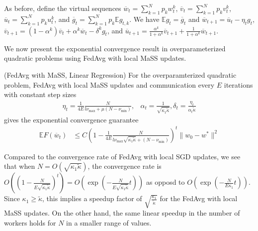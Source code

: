  As before, define the virtual sequences $\overline{w}_{t}=\sum_{k=1}^{N}p_{k}w_{t}^{k}$,
 $\overline{v}_{t}=\sum_{k=1}^{N}p_{k}v_{t}^{k}$, $\overline{u}_{t}=\sum_{k=1}^{N}p_{k}u_{t}^{k}$,
 and $\overline{g}_{t}=\sum_{k=1}^{N}p_{k}\mathbb{E}g_{t,k}$. We have
 $\mathbb{E}g_{t}=\overline{g}_{t}$ and $\overline{w}_{t+1}=\overline{u}_{t}-\eta_{t}g_{t}$,
 $\overline{v}_{t+1}=(1-\alpha^{k})\overline{v}_{t}+\alpha^{k}\overline{w}_{t}-\delta^{k}g_{t}$,
 and $\overline{u}_{t+1}=\frac{\alpha^{k}}{1+\alpha^{k}}\overline{v}_{t+1}+\frac{1}{1+\alpha^{k}}\overline{w}_{t+1}$. 
 
 We now present the exponential convergence result in overparameterized
 quadratic problems using FedAvg with local MaSS updates. 
 \begin{theorem}
 	(FedAvg with MaSS, Linear Regression) For the overparamterized quadratic
 	problem, FedAvg with local MaSS updates and communication every $E$
 	iterations with constant step sizes 
 	\begin{align*}
 	\eta_{t}=\frac{1}{4E}\frac{N}{l\nu_{\max}+\mu(N-\nu_{\min})}, & \alpha_{t}=\frac{1}{\sqrt{\kappa_{1}\tilde{\kappa}}},\delta_{t}=\frac{\eta_{t}}{\alpha_{t}\tilde{\kappa}}
 	\end{align*}
 	gives the exponential convergence guarantee 
 	\begin{align*}
 	\mathbb{E}F(\overline{w}_{t}) & \leq C(1-\frac{1}{4E}\frac{N}{l\nu_{\max}\sqrt{\kappa_{1}\tilde{\kappa}}+(N-\nu_{\min})})^{t}\|w_{0}-w^{\ast}\|^{2}
 	\end{align*}
 \end{theorem}
 Compared to the convergence rate of FedAvg with local SGD updates,
 we see that when $N=O(\sqrt{\kappa_{1}\tilde{\kappa}})$, the convergence
 rate is $O((1-\frac{N}{E\sqrt{\kappa_{1}\tilde{\kappa}}})^{t})=O(\exp(-\frac{N}{E\sqrt{\kappa_{1}\tilde{\kappa}}}t))$
 as opposd to $O(\exp(-\frac{N}{E\kappa_{1}}t))$. Since $\kappa_{1}\geq\tilde{\kappa}$,
 this implies a speedup factor of $\sqrt{\frac{\kappa_{1}}{\tilde{\kappa}}}$
 for the FedAvg with local MaSS updates. On the other hand, the same
 linear speedup in the number of workers holds for $N$ in a smaller
 range of values. 